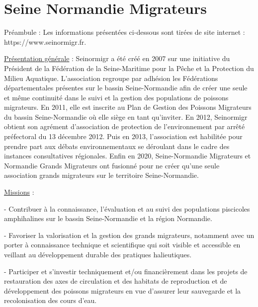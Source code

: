 \documentclass[11pt,titlepage,twoside]{article}\usepackage[]{graphicx}\usepackage[table]{xcolor}
\begin{document}
\listoftables

\hypersetup{pageanchor=false}

\clearpage

 \setcounter{page}{1} 

\clearpage


\section{Seine Normandie Migrateurs}


Préambule : Les informations présentées ci-dessous sont tirées de site internet : https://www.seinormigr.fr. 
\vspace{1cm}

\underline{Présentation générale} : Seinormigr a été créé en 2007 sur une initiative du Président de la Fédération de la Seine-Maritime pour la Pêche et la Protection du Milieu Aquatique. L’association regroupe par adhésion les Fédérations départementales présentes sur le bassin Seine-Normandie afin de créer une seule et même continuité dans le suivi et la gestion des populations de poissons migrateurs. 
En 2011, elle est inscrite au Plan de Gestion des Poissons Migrateurs du bassin Seine-Normandie où elle siège en tant qu’inviter. 
En 2012, Seinormigr obtient son agrément d’association de protection de l’environnement par arrêté préfectoral du 13 décembre 2012. Puis en 2013, l'association est habilitée pour prendre part aux débats environnementaux se déroulant dans le cadre des instances consultatives régionales. 
Enfin en 2020, Seine-Normandie Migrateurs et Normandie Grands Migrateurs ont fusionné pour ne créer qu'une seule association grands migrateurs sur le territoire Seine-Normandie.
\vspace{1cm}

\underline{Missions} :

-	Contribuer à la connaissance, l’évaluation et au suivi des populations piscicoles amphihalines sur le bassin Seine-Normandie et la région Normandie.

-	Favoriser la valorisation et la gestion des grands migrateurs, notamment avec un porter à connaissance technique et scientifique qui soit visible et accessible en veillant au développement durable des pratiques halieutiques.

-	Participer et s’investir techniquement et/ou financièrement dans les projets de restauration des axes de circulation et des habitats de reproduction et de développement des poissons migrateurs en vue d’assurer leur sauvegarde et la recolonisation des cours d’eau.
\end{document}
